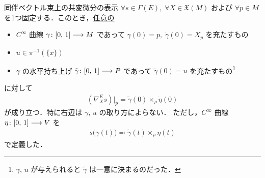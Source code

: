 \documentclass[TQFT_main]{subfiles}
\begin{document}
\begin{mytheo}[label=thm:codv-assoc-HL]{同伴ベクトル束上の共変微分の表示}
    $\forall s \in \Gamma(E),\; \forall X \in \mathfrak{X}(M)$ および $\forall p \in M$ を1つ固定する．このとき，\underline{任意の}
    \begin{itemize}
        \item $C^\infty$ 曲線 $\gamma \colon [0,\, 1] \longrightarrow M$ であって $\gamma(0) = p,\; \dot{\gamma}(0) = X_p$ を充たすもの
        \item $u \in \pi^{-1}(\{x\})$
        \item $\gamma$ の\hyperref[def:horizontal-lift-curve]{水平持ち上げ} $\tilde{\gamma} \colon [0,\, 1] \longrightarrow P$ であって $\tilde{\gamma}(0) = u$ を充たすもの\footnote{$\gamma,\, u$ が与えられると $\tilde{\gamma}$ は一意に決まるのだった．}
    \end{itemize}
    に対して
    \begin{align}
        (\nabla^E_X s)|_p = \tilde{\gamma}(0) \times_\rho \dot{\eta}(0)
    \end{align}
    が成り立つ．特に右辺は $\gamma,\, u$ の取り方によらない．
    ただし，$C^\infty$ 曲線 $\eta \colon [0,\, 1] \longrightarrow V$ を
    \begin{align}
        s \bigl( \gamma(t) \bigr) \eqqcolon \tilde{\gamma}(t) \times_\rho \eta(t)
    \end{align}
    で定義した．
\end{mytheo}
\end{document}
